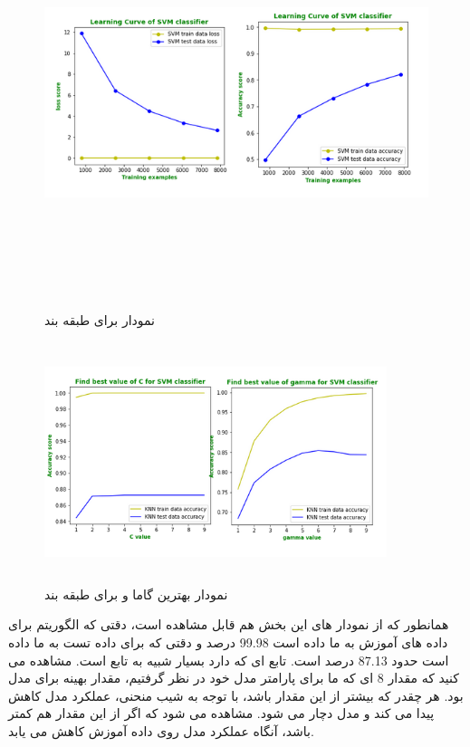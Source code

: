 \documentclass[12pt,onecolumn,a4paper]{article}
\begin{document}
\begin{figure}
  \centering
  \includegraphics[width=15cm,height=12cm,keepaspectratio]{13.png}
  \caption{نمودار  برای طبقه بند }
  \label{fig:LCSVM}
\end{figure}

\begin{figure}
  \centering
  \includegraphics[width=10cm,height=7cm,keepaspectratio]{14.png}
  \caption{نمودار بهترین گاما و  برای طبقه بند }
  \label{fig:BestGammaSVM}
\end{figure}

همانطور که از نمودار های این بخش هم قابل مشاهده است، دقتی که الگوریتم  برای داده های آموزش به ما داده است 99.98 درصد و دقتی که برای داده تست به ما داده است حدود 87.13 درصد است. تابع  ای که  دارد بسیار شبیه به تابع  است.
مشاهده می کنید که مقدار 8 ای که ما برای پارامتر  مدل خود در نظر گرفتیم، مقدار بهینه برای مدل بود. هر چقدر که بیشتر از این مقدار باشد، با توجه به شیب منحنی، عملکرد مدل کاهش پیدا می کند و مدل دچار  می شود. مشاهده می شود که اگر از این مقدار هم کمتر باشد، آنگاه عملکرد مدل روی داده آموزش کاهش می یابد.
\end{document}
